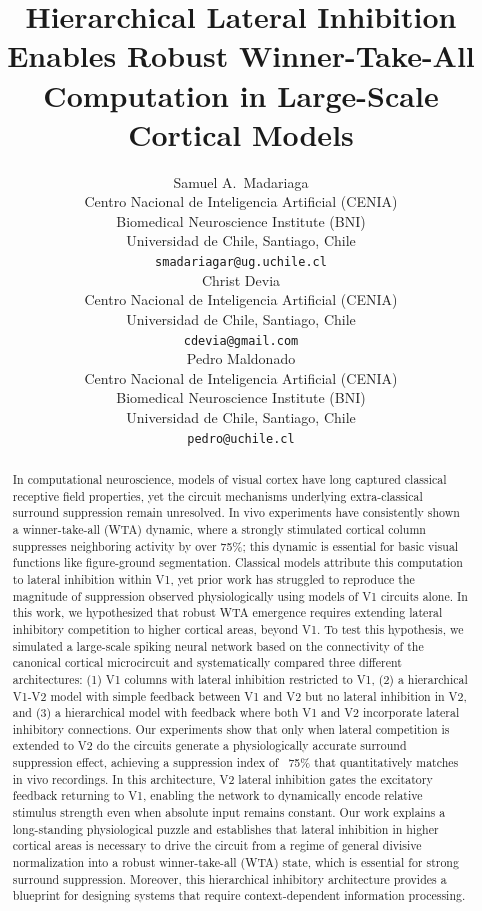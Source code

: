 \documentclass{article}
\title{Hierarchical Lateral Inhibition Enables Robust Winner-Take-All Computation in Large-Scale Cortical Models}
\author{
  Samuel A.~Madariaga \\
  Centro Nacional de Inteligencia Artificial (CENIA) \\
  Biomedical Neuroscience Institute (BNI) \\
  Universidad de Chile, Santiago, Chile \\
  \texttt{smadariagar@ug.uchile.cl} \\
  \And
  Christ Devia \\
  Centro Nacional de Inteligencia Artificial (CENIA) \\
  Universidad de Chile, Santiago, Chile \\
  \texttt{cdevia@gmail.com} \\
  \AND
  Pedro Maldonado \\
  Centro Nacional de Inteligencia Artificial (CENIA) \\
  Biomedical Neuroscience Institute (BNI) \\
  Universidad de Chile, Santiago, Chile \\
  \texttt{pedro@uchile.cl} \\
}
\begin{document}
\maketitle


\begin{abstract}
   In computational neuroscience, models of visual cortex have long captured classical receptive field properties, yet the circuit mechanisms underlying extra-classical surround suppression remain unresolved. In vivo experiments have consistently shown a winner-take-all (WTA) dynamic, where a strongly stimulated cortical column suppresses neighboring activity by over 75\%; this dynamic is essential for basic visual functions like figure-ground segmentation. Classical models attribute this computation to lateral inhibition within V1, yet prior work has struggled to reproduce the magnitude of suppression observed physiologically using models of V1 circuits alone.
   In this work, we hypothesized that robust WTA emergence requires extending lateral inhibitory competition to higher cortical areas, beyond V1. To test this hypothesis, we simulated a large-scale spiking neural network based on the connectivity of the canonical cortical microcircuit and systematically compared three different architectures: (1) V1 columns with lateral inhibition restricted to V1, (2) a hierarchical V1-V2 model with simple feedback between V1 and V2 but no lateral inhibition in V2, and (3) a hierarchical model with feedback where both V1 and V2 incorporate lateral inhibitory connections. Our experiments show that only when lateral competition is extended to V2 do the circuits generate a physiologically accurate surround suppression effect, achieving a suppression index of ~75\% that quantitatively matches in vivo recordings. In this architecture, V2 lateral inhibition gates the excitatory feedback returning to V1, enabling the network to dynamically encode relative stimulus strength even when absolute input remains constant.
   Our work explains a long-standing physiological puzzle and establishes that lateral inhibition in higher cortical areas is necessary to drive the circuit from a regime of general divisive normalization into a robust winner-take-all (WTA) state, which is essential for strong surround suppression. Moreover, this hierarchical inhibitory architecture provides a blueprint for designing systems that require context-dependent information processing.   
\end{abstract}
\end{document}
